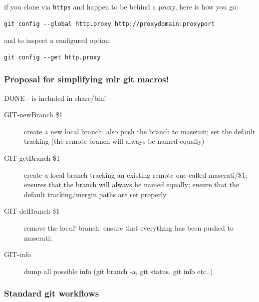 \begin{itemize}
if you clone via \verb+https+ and happen to be behind a proxy, here is how
you go:
\begin{code}\begin{verbatim}
git config --global http.proxy http://proxydomain:proxyport
\end{verbatim} \end{code}
and to inspect a configured option:
\begin{code}\begin{verbatim}
git config --get http.proxy 
\end{verbatim} \end{code}

\end{itemize}

\subsubsection{Proposal for simplifying mlr git macros!}

DONE - is included in share/bin!

\begin{description}
\item[GIT-newBranch \$1]

create a new local branch; also push the branch to maserati; set the
default tracking (the remote branch will always be named equally)

\item[GIT-getBranch \$1]

create a local branch tracking an existing remote one called
maserati/\$1; ensures that the branch will always be named equally;
ensure that the default tracking/mergin paths are set properly

\item[GIT-delBranch \$1]

remove the local! branch; ensure that everything has been pushed to
maserati;

\item[GIT-info]

dump all possible info (git branch -a, git status, git info etc..)

\end{description}






\subsubsection{Standard git workflows}


